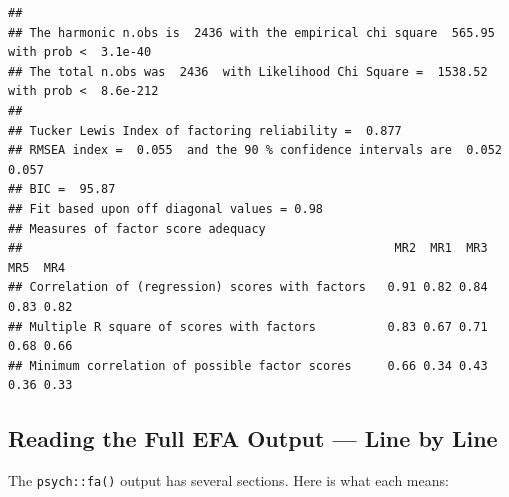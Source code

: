 \documentclass[
]{article}
\begin{document}
\begin{verbatim}
## 
## The harmonic n.obs is  2436 with the empirical chi square  565.95  with prob <  3.1e-40 
## The total n.obs was  2436  with Likelihood Chi Square =  1538.52  with prob <  8.6e-212 
## 
## Tucker Lewis Index of factoring reliability =  0.877
## RMSEA index =  0.055  and the 90 % confidence intervals are  0.052 0.057
## BIC =  95.87
## Fit based upon off diagonal values = 0.98
## Measures of factor score adequacy             
##                                                    MR2  MR1  MR3  MR5  MR4
## Correlation of (regression) scores with factors   0.91 0.82 0.84 0.83 0.82
## Multiple R square of scores with factors          0.83 0.67 0.71 0.68 0.66
## Minimum correlation of possible factor scores     0.66 0.34 0.43 0.36 0.33
\end{verbatim}

\subsection{Reading the Full EFA Output --- Line by
Line}\label{reading-the-full-efa-output-line-by-line}

The \texttt{psych::fa()} output has several sections. Here is what each
means:
\end{document}
